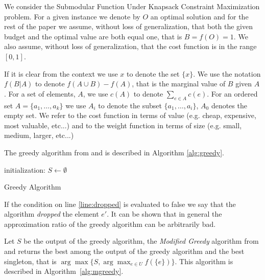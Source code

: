 We consider the Submodular Function Under
Knapsack Constraint Maximization problem.
For a given instance we denote by $O$ an optimal solution and for the rest of the 
paper we assume, without loss of generalization, that both the 
given budget and the optimal value are both equal one, that is $B = f(O) = 1$.
We also assume, without loss of generalization, 
that the cost function is in the range $[0, 1]$.
 
If it is clear from the context we use $x$ to denote the set $\{x\}$. 
We use the notation $f(B|A)$ to denote $f(A \cup B) - f(A)$, that is the marginal value of $B$
given $A$. 
For a set of elements, $A$, we use $c(A)$ to denote $\sum_{e \in A}c(e)$.
For an ordered set $A = \{a_1, \dots, a_k\}$ we use $A_i$ to denote the subset 
$\{a_1, \dots, a_i\}$, $A_0$ denotes the empty set.
We refer to the cost function in terms of value (e.g. cheap, expensive, most valuable, etc...) and 
to the weight function in terms of size (e.g. small, medium, larger, etc...) 

The greedy algorithm from \cite{khuller1999budgeted} and \cite{krause2005note}
is described in Algorithm \ref{alg:greedy}.

\begin{algorithm}[H]
\label{alg:greedy}



initialization: $S \leftarrow \emptyset$
\\
\caption{Greedy Algorithm}
\end{algorithm}
 
If the condition on line \ref{line:dropped} is evaluated to false we say that
the algorithm \emph{dropped} the element $e'$.
It can be shown that in general the approximation ratio of the greedy algorithm 
can be arbitrarily bad.

Let $S$ be the output of the greedy algorithm, the \emph{Modified Greedy} algorithm 
from \cite{khuller1999budgeted} and \cite{krause2005note} 
returns the best among the output of the greedy algorithm and the best singleton, 
that is $\arg\max\{S, \displaystyle{\arg\max_{e \in U}}f(\{e\})\}$.
This algorithm is described in Algorithm~\ref{alg:mgreedy}.  

